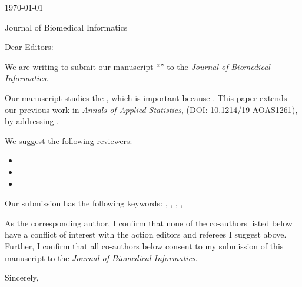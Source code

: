 


\hfill{\today}

Journal of Biomedical Informatics

\bigskip

Dear Editors:

We are writing to submit our manuscript ``'' to the \emph{Journal of Biomedical Informatics}.

Our manuscript studies the , which is important because . This paper extends our previous work in \emph{Annals of Applied Statistics},  (DOI: 10.1214/19-AOAS1261), by addressing . 

We suggest the following reviewers:
\begin{itemize}
    \item {}
    \item {}
    \item {}
\end{itemize}


Our submission has the following keywords: , , , , 

As the corresponding author, I confirm that none of the co-authors listed below have a conflict of interest with the action editors and referees I suggest above. Further, I confirm that all co-authors below consent to my submission of this manuscript to the \emph{Journal of Biomedical Informatics}.

\bigskip

Sincerely,

\medskip

